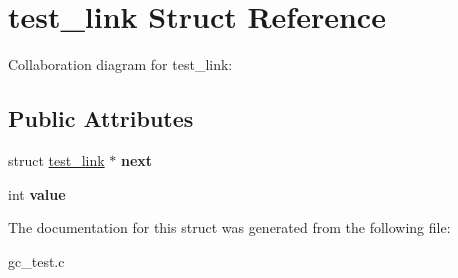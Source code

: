 \hypertarget{structtest__link}{}\section{test\+\_\+link Struct Reference}
\label{structtest__link}


Collaboration diagram for test\+\_\+link\+:
\subsection*{Public Attributes}
\begin{DoxyCompactItemize}
\item 
\hypertarget{structtest__link_a41da4adc6005519765311723cdd67e4b}{}struct \hyperlink{structtest__link}{test\+\_\+link} $\ast$ {\bfseries next}\label{structtest__link_a41da4adc6005519765311723cdd67e4b}

\item 
\hypertarget{structtest__link_ac632e3031e6095186684a51fa11ab899}{}int {\bfseries value}\label{structtest__link_ac632e3031e6095186684a51fa11ab899}

\end{DoxyCompactItemize}


The documentation for this struct was generated from the following file\+:\begin{DoxyCompactItemize}
\item 
gc\+\_\+test.\+c\end{DoxyCompactItemize}
